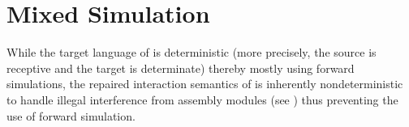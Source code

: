 \section{Mixed Simulation}
\label{sec:overview-verification:mixedsim}

While the target language of \cc{} is deterministic (more precisely,
the source is receptive and the target is determinate) thereby mostly
using forward simulations, the repaired interaction semantics of
\ccm{} is inherently nondeterministic to handle illegal interference from assembly modules
(see ) thus preventing the
use of forward simulation.

